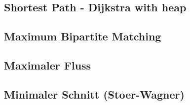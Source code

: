 %


%



%


%

\subsection{Shortest Path - Dijkstra with heap}


\subsection{Maximum Bipartite Matching}


\subsection{Maximaler Fluss}



\subsection{Minimaler Schnitt (Stoer-Wagner)}


